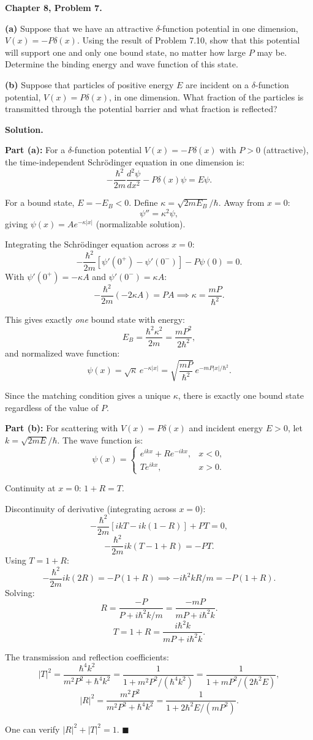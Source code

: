 \documentclass[12pt]{article}
\begin{document}
\textbf{Chapter 8, Problem 7.}

\textbf{(a)} Suppose that we have an attractive $\delta$-function potential in one dimension, $V(x) = -P\delta(x)$. Using the result of Problem 7.10, show that this potential will support one and only one bound state, no matter how large $P$ may be. Determine the binding energy and wave function of this state.

\textbf{(b)} Suppose that particles of positive energy $E$ are incident on a $\delta$-function potential, $V(x) = P\delta(x)$, in one dimension. What fraction of the particles is transmitted through the potential barrier and what fraction is reflected?

\bigskip
\textbf{Solution.}

\textbf{Part (a):}
For a $\delta$-function potential $V(x) = -P\delta(x)$ with $P>0$ (attractive), the time-independent Schr\"odinger equation in one dimension is:
\[
-\frac{\hbar^2}{2m}\frac{d^2\psi}{dx^2} - P\delta(x)\psi = E\psi.
\]

For a bound state, $E = -E_B < 0$. Define $\kappa = \sqrt{2mE_B}/\hbar$. Away from $x=0$:
\[
\psi''= \kappa^2\psi,
\]
giving $\psi(x) = Ae^{-\kappa|x|}$ (normalizable solution).

Integrating the Schr\"odinger equation across $x=0$:
\[
-\frac{\hbar^2}{2m}[\psi'(0^+)-\psi'(0^-)] - P\psi(0) = 0.
\]
With $\psi'(0^+) = -\kappa A$ and $\psi'(0^-) = \kappa A$:
\[
-\frac{\hbar^2}{2m}(-2\kappa A) = PA \implies \kappa = \frac{mP}{\hbar^2}.
\]

This gives exactly \emph{one} bound state with energy:
\[
\boxed{E_B = \frac{\hbar^2\kappa^2}{2m} = \frac{mP^2}{2\hbar^2},}
\]
and normalized wave function:
\[
\boxed{\psi(x) = \sqrt{\kappa}\,e^{-\kappa|x|} = \sqrt{\frac{mP}{\hbar^2}}\,e^{-mP|x|/\hbar^2}.}
\]

Since the matching condition gives a unique $\kappa$, there is exactly one bound state regardless of the value of $P$.

\bigskip
\textbf{Part (b):}
For scattering with $V(x) = P\delta(x)$ and incident energy $E>0$, let $k = \sqrt{2mE}/\hbar$. The wave function is:
\[
\psi(x) = \begin{cases} e^{ikx} + Re^{-ikx}, & x<0, \\ Te^{ikx}, & x>0. \end{cases}
\]

Continuity at $x=0$: $1+R = T$.

Discontinuity of derivative (integrating across $x=0$):
\[
-\frac{\hbar^2}{2m}[ikT - ik(1-R)] + PT = 0,
\]
\[
-\frac{\hbar^2}{2m}ik(T-1+R) = -PT.
\]
Using $T = 1+R$:
\[
-\frac{\hbar^2}{2m}ik(2R) = -P(1+R) \implies -i\hbar^2 kR/m = -P(1+R).
\]
Solving:
\[
R = \frac{-P}{P + i\hbar^2 k/m} = \frac{-mP}{mP+i\hbar^2 k}.
\]
\[
T = 1+R = \frac{i\hbar^2 k}{mP+i\hbar^2 k}.
\]

The transmission and reflection coefficients:
\[
\boxed{|T|^2 = \frac{\hbar^4 k^2}{m^2P^2+\hbar^4 k^2} = \frac{1}{1+m^2P^2/(\hbar^4 k^2)} = \frac{1}{1+mP^2/(2\hbar^2 E)},}
\]
\[
\boxed{|R|^2 = \frac{m^2P^2}{m^2P^2+\hbar^4 k^2} = \frac{1}{1+2\hbar^2 E/(mP^2)}.}
\]

One can verify $|R|^2+|T|^2=1$. $\blacksquare$
\end{document}
